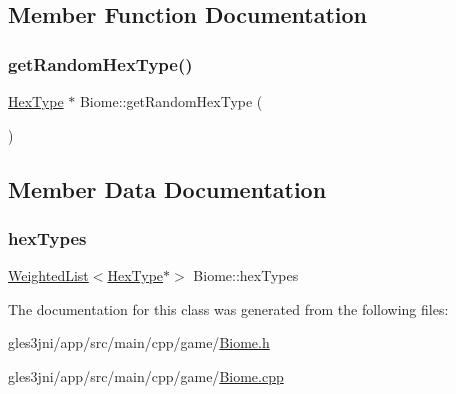 \subsection{Member Function Documentation}
\mbox{\label{class_biome_a26e3282a969afa0f9a62d187c11cd62e}} 
\subsubsection{\texorpdfstring{get\+Random\+Hex\+Type()}{getRandomHexType()}}
{\footnotesize\ttfamily \hyperlink{class_hex_type}{Hex\+Type} $\ast$ Biome\+::get\+Random\+Hex\+Type (\begin{DoxyParamCaption}{ }\end{DoxyParamCaption})}



\subsection{Member Data Documentation}
\mbox{\label{class_biome_afa5cc88732d80e8093c9c090f8dfb042}} 
\subsubsection{\texorpdfstring{hex\+Types}{hexTypes}}
{\footnotesize\ttfamily \hyperlink{class_weighted_list}{Weighted\+List}$<$\hyperlink{class_hex_type}{Hex\+Type}$\ast$$>$ Biome\+::hex\+Types\hspace{0.3cm}{\ttfamily [private]}}



The documentation for this class was generated from the following files\+:\begin{DoxyCompactItemize}
\item 
gles3jni/app/src/main/cpp/game/\hyperlink{_biome_8h}{Biome.\+h}\item 
gles3jni/app/src/main/cpp/game/\hyperlink{_biome_8cpp}{Biome.\+cpp}\end{DoxyCompactItemize}
